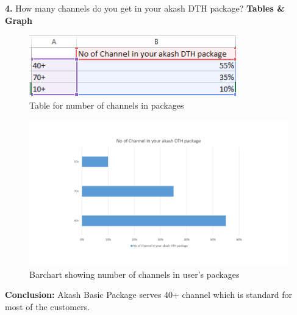 \begin{spacing}{1}
{\bf 4.} How many channels do you get in your akash DTH package?\newline
{\bf Tables \& Graph}\newline
\begin{figure}[H]
	\centering
	\includegraphics[width=0.8\textwidth]{fig4_1}
	\caption{Table for number of channels in packages}
	\label{fig:Table3}
\end{figure}
\begin{figure}[H]
	\centering
	\includegraphics[width=\textwidth]{fig4_2}
	\caption{Barchart showing number of channels in user's packages}
	\label{fig:bar1}
\end{figure}
{\bf Conclusion: }\newline
Akash Basic Package serves 40+ channel which is standard for most of the customers.


\end{spacing}
